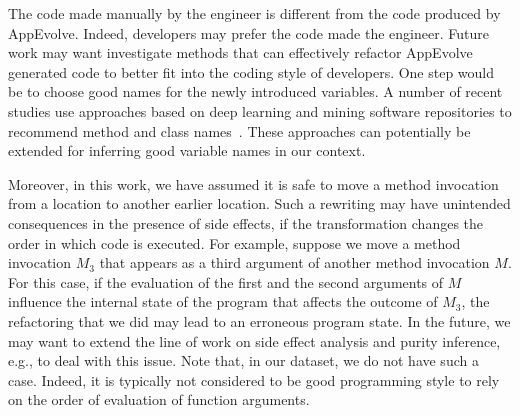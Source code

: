 
\vspace{0.5cm}The code made manually by the engineer is different from the code produced
by AppEvolve. Indeed, developers may prefer the code made the
engineer. Future work may want investigate methods that can effectively
refactor AppEvolve generated code to better fit into the coding style of
developers. One step would be to choose good names for the newly introduced
variables. A number of recent studies use approaches based on deep learning
and mining software repositories to recommend method and class
names~\cite{allamanis2015suggesting}. These approaches can potentially be extended for inferring good
variable names in our context.



Moreover, in this work, we have assumed it is safe to move a method
invocation from a location to another earlier location. Such a rewriting
may have unintended consequences in the presence of side effects, if the
transformation changes the order in which code is executed.  For example,
suppose we move a method invocation $M_3$ that appears as a third argument
of another method invocation $M$. For this case, if the evaluation of the
first and the second arguments of $M$ influence the internal state of the
program that affects the outcome of $M_3$, the refactoring that we did may
lead to an erroneous program state. In the future, we may want to extend
the line of work on side effect analysis and purity inference, e.g., to
deal with this issue. Note that, in our dataset, we do not have such a
case.  Indeed, it is typically not considered to be good programming style
to rely on the order of evaluation of function arguments.





